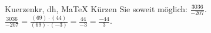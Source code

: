 \begin{MAufgabe}{Kuerzen}{kr, dh, MaTeX}
K\"urzen Sie soweit m\"oglich: $\frac{3036}{-207}$.\\ 
\ifLsg\MLoesung
\quad $\frac{3036}{-207}=\frac{(69)\cdot(44)}{(69)\cdot(-3)}=\frac{44}{-3}=\frac{-44}{3}$.\else\relax\fi
 \end{MAufgabe}